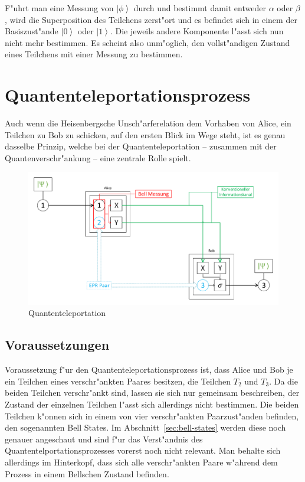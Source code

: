 \begin{refsection}
F"uhrt man eine Messung von $\left|\phi\right\rangle$ durch und bestimmt damit entweder $\alpha$ oder $\beta$, wird die Superposition des Teilchens zerst"ort und es befindet sich in einem der Basiszust"ande $\left|0\right\rangle$ oder $\left|1\right\rangle$. Die jeweils andere Komponente l"asst sich nun nicht mehr bestimmen. Es scheint also unm"oglich, den vollst"andigen Zustand eines Teilchens mit einer Messung zu bestimmen.

\section{Quantenteleportationsprozess}
%
Auch wenn die Heisenbergsche Unsch"arferelation dem Vorhaben von Alice, ein Teilchen zu Bob zu schicken, auf den ersten Blick im Wege steht, ist es genau dasselbe Prinzip, welche bei der Quantenteleportation -- zusammen mit der Quantenverschr"ankung -- eine zentrale Rolle spielt.
\begin{figure}
	\center
	\includegraphics[width=1\textwidth]{teleport/image/quantum_com.pdf}
	\caption{Quantenteleportation}
	\label{Quantenteleportation}
\end{figure}

\subsection{Voraussetzungen}

Voraussetzung f"ur den Quantenteleportationsprozess ist, dass Alice und Bob je ein Teilchen eines verschr"ankten Paares besitzen, die Teilchen $T_{2}$ und $T_{3}$. Da die beiden Teilchen  verschr"ankt sind, lassen sie sich nur gemeinsam beschreiben, der Zustand der einzelnen Teilchen l"asst sich allerdings nicht bestimmen. Die beiden Teilchen k"onnen sich in einem von vier verschr"ankten Paarzust"anden befinden, den sogenannten Bell States. Im Abschnitt~\ref{sec:bell-states} werden diese noch genauer angeschaut und sind f"ur das Verst"andnis des Quantentelportationsprozesses vorerst noch nicht relevant. Man behalte sich allerdings im Hinterkopf, dass sich alle verschr"ankten Paare w"ahrend dem Prozess in einem Bellschen Zustand befinden.


\end{refsection}
